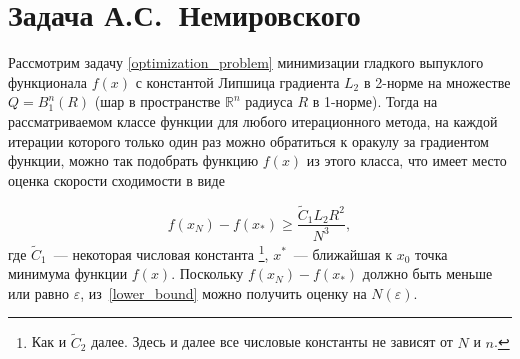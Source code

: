 \documentclass[11pt]{article}
\newcommand{\RR}{\mathbb{R}}
\begin{document}

	
	\section{Задача А.С.~Немировского}
	Рассмотрим задачу \eqref{optimization_problem} минимизации гладкого выпуклого функционала 
	$f\left( x \right)$ с константой Липшица градиента $L_2 $ в 2-норме  
	на множестве $Q=B_1^n \left( R \right)$ (шар в пространстве ${\RR}^n$ 
	радиуса $R$ в 1-норме). Тогда 
	 на рассматриваемом классе функции для любого итерационного метода, на каждой итерации которого только один раз можно обратиться к оракулу за градиентом функции, можно так подобрать функцию $f(x)$ из этого класса, что имеет место оценка скорости сходимости \cite{guzman-nemirovski} в виде
	
	\begin{equation}\label{lower_bound}
		f\left( {x_N} \right)-f(x_*) \ge \frac{\tilde {C}_1 L_2 R^2}{N^3},
	\end{equation}
	где $\tilde{C}_1$~--- некоторая числовая константа \footnote{Как и $\tilde{C}_2$ далее. Здесь и далее все числовые константы не зависят от $N$ и $n$.}, $x^*$~--- ближайшая к $x_0$ точка минимума функции $f(x)$. Поскольку
	$f\left( {x_N} \right)-f(x_*)$ должно быть меньше или
	равно $\varepsilon$, из~\eqref{lower_bound} можно получить оценку на $N(\varepsilon)$.
	
\end{document}
